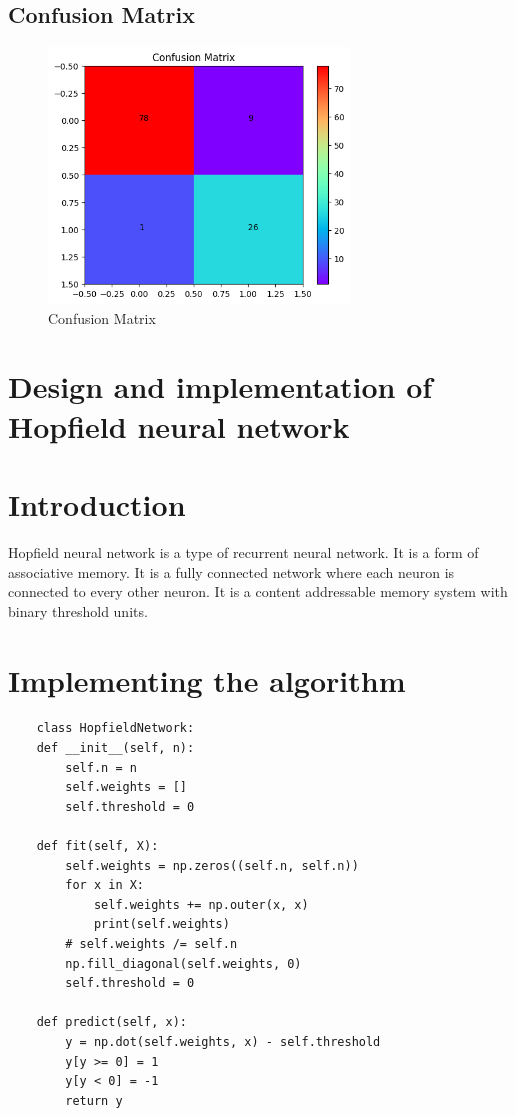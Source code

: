 \subsection{Confusion Matrix}
\begin{figure}[ht]
    \centering
    \includegraphics[width=8cm]{ch/figures/ch5.3.png}
    \caption{Confusion Matrix}
    \label{fig:loss}
\end{figure}
\newpage
\section{Design and implementation of Hopfield neural network}
\section{Introduction}
Hopfield neural network is a type of recurrent neural network. It is a form of associative memory. It is a fully connected network where each neuron is connected to every other neuron. It is a content addressable memory system with binary threshold units.\\
\section{Implementing the algorithm}
\begin{verbatim}
    class HopfieldNetwork:
    def __init__(self, n):
        self.n = n
        self.weights = []
        self.threshold = 0
    
    def fit(self, X):
        self.weights = np.zeros((self.n, self.n))
        for x in X:
            self.weights += np.outer(x, x)
            print(self.weights)
        # self.weights /= self.n
        np.fill_diagonal(self.weights, 0)
        self.threshold = 0
    
    def predict(self, x):
        y = np.dot(self.weights, x) - self.threshold
        y[y >= 0] = 1
        y[y < 0] = -1
        return y
\end{verbatim}
